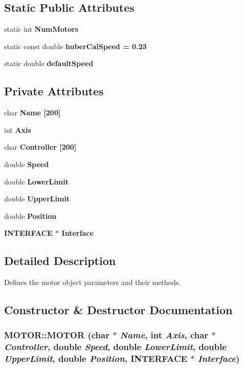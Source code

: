 \subsection*{Static Public Attributes}
\begin{CompactItemize}
\item 
static int \bf{Num\-Motors}
\item 
static const double \bf{huber\-Cal\-Speed} = 0.23
\item 
static double \bf{default\-Speed}
\end{CompactItemize}
\subsection*{Private Attributes}
\begin{CompactItemize}
\item 
char \bf{Name} [200]
\item 
int \bf{Axis}
\item 
char \bf{Controller} [200]
\item 
double \bf{Speed}
\item 
double \bf{Lower\-Limit}
\item 
double \bf{Upper\-Limit}
\item 
double \bf{Position}
\item 
\bf{INTERFACE} $\ast$ \bf{Interface}
\end{CompactItemize}


\subsection{Detailed Description}
Defines the motor object parameters and their methods. 



\subsection{Constructor \& Destructor Documentation}
\subsubsection{\setlength{\rightskip}{0pt plus 5cm}MOTOR::MOTOR (char $\ast$ {\em Name}, int {\em Axis}, char $\ast$ {\em Controller}, double {\em Speed}, double {\em Lower\-Limit}, double {\em Upper\-Limit}, double {\em Position}, \bf{INTERFACE} $\ast$ {\em Interface})}\label{classMOTOR_5e587c9f0ec15208f5e0e49536e750bf}


